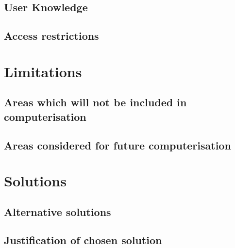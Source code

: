 \subsection{User Knowledge}

\subsection{Access restrictions}

\section{Limitations}

\subsection{Areas which will not be included in computerisation}

\subsection{Areas considered for future computerisation}

\section{Solutions}

\subsection{Alternative solutions}

\subsection{Justification of chosen solution}
